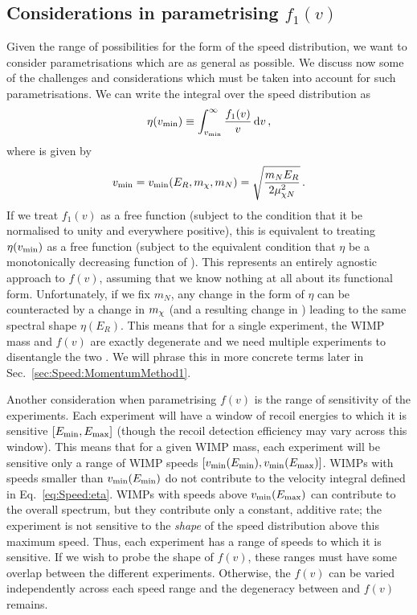 \subsection{Considerations in parametrising $f_1(v)$}


Given the range of possibilities for the form of the speed distribution, we want to consider parametrisations which are as general as possible. We discuss now some of the challenges and considerations which must be taken into account for such parametrisations. We can write the integral over the speed distribution as
\begin{equation}
\label{eq:Speed:eta}
\eta(\vmin) \equiv \int_{\vmin}^\infty \frac{f_1(v)}{v}\,\mathrm{d}v\,,
\end{equation}
where \vmin is given by
\begin{equation}
v_\textrm{min} = v_\textrm{min}(E_R, \mchi, m_N) = \sqrt{\frac{m_N E_R}{2 \mu_{\chi N}^2}}\,.
\end{equation}
If we treat $f_1(v)$ as a free function (subject to the condition that it be normalised to unity and everywhere positive), this is equivalent to treating $\eta(\vmin)$ as a free function (subject to the equivalent condition that $\eta$ be a monotonically decreasing function of \vmin). This represents an entirely agnostic approach to $f(v)$, assuming that we know nothing at all about its functional form. Unfortunately, if we fix $m_N$, any change in the form of $\eta$ can be counteracted by a change in $\mchi$ (and a resulting change in \vmin) leading to the same spectral shape $\eta(E_R)$. This means that for a single experiment, the WIMP mass and $f(v)$ are exactly degenerate and we need multiple experiments to disentangle the two \cite{Drees:2008}. We will phrase this in more concrete terms later in Sec.~\ref{sec:Speed:MomentumMethod1}.

Another consideration when parametrising $f(v)$ is the range of sensitivity of the experiments. Each experiment will have a window of recoil energies to which it is sensitive $\left[\Emin, \Emax\right]$ (though the recoil detection efficiency may vary across this window). This means that for a given WIMP mass, each experiment will be sensitive only a range of WIMP speeds $\left[\vmin(\Emin), \vmin(\Emax)\right]$. WIMPs with speeds smaller than $\vmin(\Emin)$ do not contribute to the velocity integral defined in Eq.~\ref{eq:Speed:eta}. WIMPs with speeds above $\vmin(\Emax)$ can contribute to the overall spectrum, but they contribute only a constant, additive rate; the experiment is not sensitive to the \textit{shape} of the speed distribution above this maximum speed. Thus, each experiment has a range of speeds to which it is sensitive. If we wish to probe the shape of $f(v)$, these ranges must have some overlap between the different experiments. Otherwise, the $f(v)$ can be varied independently across each speed range and the degeneracy between \mchi and $f(v)$ remains. 

